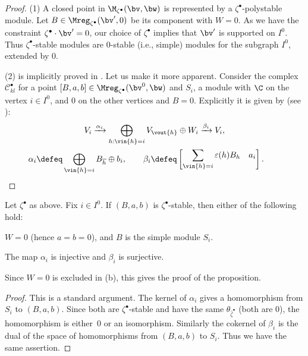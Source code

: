 \begin{proof}
  (1) A closed point in $\M_{\zeta^\bullet}(\bv,\bw)$ is represented
  by a $\zeta^\bullet$-polystable module. Let
  $B\in\Mreg_{\zeta^\bullet}(\bv',0)$ be its component with $W = 0$.
  As we have the constraint $\zeta^\bullet\cdot \bv' = 0$, our choice
  of $\zeta^\bullet$ implies that $\bv'$ is supported on $I^0$. Thus
  $\zeta^\bullet$-stable modules are $0$-stable (i.e., simple) modules
  for the subgraph $I^0$, extended by $0$.


(2) is implicitly proved in . Let us make it
more apparent. Consider the complex $\mathscr{C}^{\bullet}_{kl}$ for a point
$[B,a,b]\in \Mreg_{\zeta^\bullet}(\bv^0,\bw)$ and $S_i$, a module with
$\C$ on the vertex $i\in I^0$, and $0$ on the other vertices and $B =
0$. Explicitly it is given by (see \cite[(4.2)]{Na-alg}):
\begin{gather}\label{eq:crystalcpx}
 V_i
  \xrightarrow{\alpha_i}
  \bigoplus_{h: \vin{h} = i} V_{\vout{h}} \oplus W_i
  \xrightarrow{\beta_i} V_i,
\\
   \alpha_i\defeq
    \bigoplus_{\vin{h}=i} B_{\overline h}\oplus b_i, \qquad
   \beta_i\defeq
    \begin{bmatrix}
    \displaystyle\sum_{\vin{h}=i} \varepsilon(h) B_h & a_i
    \end{bmatrix}.\tag*{\qed}
\end{gather}\renewcommand{\qed}{}
\end{proof}

\begin{Lemma}\label{lem:betasurj}
  Let $\zeta^\bullet$ as above. Fix $i\in I^0$. If $(B,a,b)$ is
  $\zeta^\bullet$-stable, then either of the following hold\textup:
  \begin{aenume}\itemsep=0pt
  \item $W = 0$ \textup(hence $a = b = 0$\textup), and $B$ is the simple
    module $S_i$.

  \item The map $\alpha_i$ is injective and $\beta_i$ is
    surjective.
  \end{aenume}
\end{Lemma}

Since $W = 0$ is excluded in (b), this gives the proof of the proposition.

\begin{proof}
  This is a standard argument. The kernel of $\alpha_i$ gives a
  homomorphism from $S_i$ to $(B,a,b)$. Since both are
  $\zeta^\bullet$-stable and have the same
  $\theta_{\widehat\zeta^\bullet}$ (both are $0$), the homomorphism is
  \mbox{either}~$0$ or an isomorphism. Similarly the cokernel of $\beta_i$ is
  the dual of the space of homomorphisms from $(B,a,b)$ to $S_i$. Thus
  we have the same assertion.
\end{proof}

